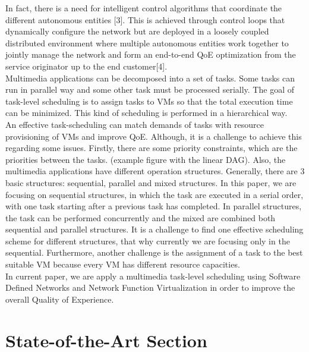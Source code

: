 \documentclass[a4paper]{article}
\begin{document}
In fact, there is a need for intelligent control algorithms that coordinate the different autonomous entities [3]. This is achieved through control loops that dynamically configure the network but are deployed in a loosely coupled distributed environment where multiple autonomous entities work together to jointly manage the network and form an end-to-end QoE optimization from the service originator up to the end customer[4]. \\

Multimedia applications can be decomposed into a set of tasks. Some tasks can run in parallel way and some other task must be processed serially. The goal of task-level scheduling is to assign tasks to VMs so that the total execution time can be minimized. This kind of scheduling is performed in a hierarchical way.\\

An effective task-scheduling can match demands of tasks with resource provisioning of VMs and improve QoE. Although, it is a challenge to achieve this regarding some issues. Firstly, there are some priority constraints, which are the priorities between the tasks. (example figure with the linear DAG). Also, the multimedia applications have different operation structures. Generally, there are 3 basic structures: sequential, parallel and mixed structures. In this paper, we are focusing on sequential structures, in which the task are executed in a serial order, with one task starting after a previous task has completed. In parallel structures, the task can be performed concurrently and the mixed are combined both sequential and parallel structures. It is a challenge to find one effective scheduling scheme for different structures, that why currently we are focusing only in the sequential. Furthermore, another challenge is the assignment of a task to the best suitable VM because every VM has different resource capacities. \\

In current paper, we are apply a multimedia task-level scheduling using Software Defined Networks and Network Function Virtualization in order to improve the overall Quality of Experience.  

\section{State-of-the-Art Section}
\end{document}
